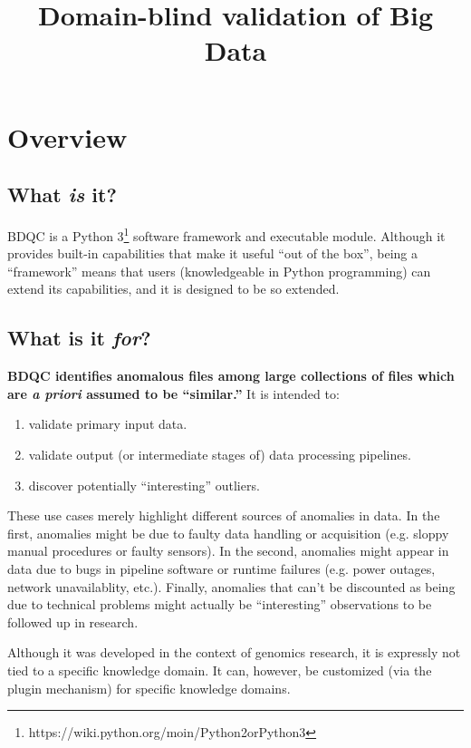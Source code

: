 \documentclass {article}
\begin{document}
\title{Domain-blind validation of Big Data}

\maketitle

\tableofcontents

\section{Overview}
\subsection{What \emph{is} it?}
BDQC is a Python 3\footnote{https://wiki.python.org/moin/Python2orPython3}
software framework and executable module.
Although it provides built-in capabilities that make it useful
``out of the box'', being a ``framework'' means that users (knowledgeable
in Python programming) can extend its capabilities, and it is designed to
be so extended.

\subsection{What is it \emph{for}?}
{\bf BDQC identifies anomalous files among large collections of files which are
\emph{a priori} assumed to be ``similar.''}
It is intended to:
\begin{enumerate}
\item validate primary input data.
\item validate output (or intermediate stages of) data processing pipelines.
\item discover potentially ``interesting'' outliers.
\end{enumerate}
These use cases merely highlight different sources of anomalies in data.
In the first, anomalies might be due to faulty data handling or acquisition
(e.g. sloppy manual procedures or faulty sensors). In the second, anomalies
might appear in data due to bugs in pipeline software or runtime failures
(e.g. power outages, network unavailablity, etc.). Finally, anomalies that
can't be discounted as being due to technical problems might actually be
``interesting'' observations to be followed up in research.

Although it was developed in the context of genomics research, it is 
expressly not tied to a specific knowledge domain. It can, however,
be customized (via the plugin mechanism) for specific knowledge domains.
\end{document}
